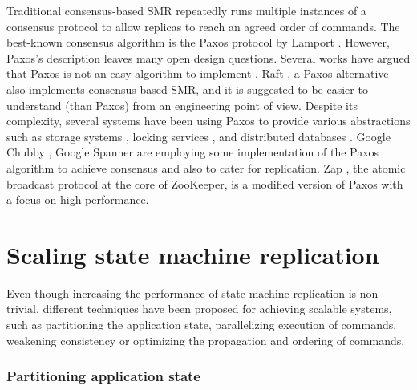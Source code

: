 Traditional consensus-based SMR repeatedly runs multiple instances of a consensus
protocol to allow replicas to reach an agreed order of commands. The best-known
consensus algorithm is the Paxos protocol by Lamport \cite{Lam98}. However,
Paxos's description leaves many open design questions. Several works have argued
that Paxos is not an easy algorithm to implement \cite{paxoslive,
Kirsch:2008paxos}. Raft \cite{184040}, a Paxos alternative also implements
consensus-based SMR, and it is suggested to be easier to understand (than Paxos)
from an engineering point of view. Despite its complexity, several systems
have been using Paxos to provide various abstractions such as storage systems
\cite{Bolosky:20011paxos}, locking services \cite{Mike:2006chubby}, and
distributed databases \cite{Baker:2011megastore}. Google Chubby
\cite{Mike:2006chubby}, Google Spanner \cite{corbett2013spanner} are employing
some implementation of the Paxos algorithm to achieve consensus and also to
cater for replication. Zap \cite{Hunt:2010zoo}, the atomic broadcast protocol at
the core of ZooKeeper, is a modified version of Paxos with a focus on
high-performance.

\section{Scaling state machine replication}

Even though increasing the performance of state machine replication is
non-trivial, different techniques have been proposed for achieving scalable
systems, such as partitioning the application state, parallelizing execution of
commands, weakening consistency or optimizing the propagation and ordering of
commands. 

\subsubsection{Partitioning application state}

